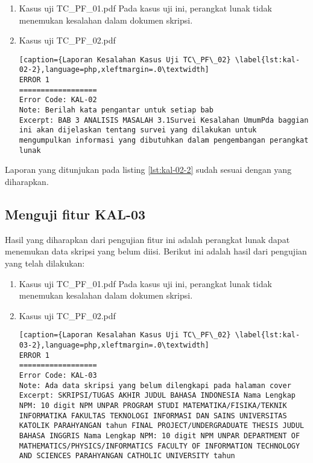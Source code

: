 \begin{enumerate}
	\item Kasus uji TC\_PF\_01.pdf
	Pada kasus uji ini, perangkat lunak tidak menemukan kesalahan dalam dokumen skripsi.
	
	\item Kasus uji TC\_PF\_02.pdf
	
\begin{lstlisting}[caption={Laporan Kesalahan Kasus Uji TC\_PF\_02}	\label{lst:kal-02-2},language=php,xleftmargin=.0\textwidth]
ERROR 1
==================
Error Code: KAL-02
Note: Berilah kata pengantar untuk setiap bab
Excerpt: BAB 3 ANALISIS MASALAH 3.1Survei Kesalahan UmumPda baggian ini akan dijelaskan tentang survei yang dilakukan untuk mengumpulkan informasi yang dibutuhkan dalam pengembangan perangkat lunak
\end{lstlisting}
\end{enumerate}

Laporan yang ditunjukan pada listing \ref{lst:kal-02-2} sudah sesuai dengan yang diharapkan.

\subsection{Menguji fitur KAL-03}
Hasil yang diharapkan dari pengujian fitur ini adalah perangkat lunak dapat menemukan data skripsi yang belum diisi. Berikut ini adalah hasil dari pengujian yang telah dilakukan:

\begin{enumerate}
	\item Kasus uji TC\_PF\_01.pdf
	Pada kasus uji ini, perangkat lunak tidak menemukan kesalahan dalam dokumen skripsi.
	
	\item Kasus uji TC\_PF\_02.pdf
	
\begin{lstlisting}[caption={Laporan Kesalahan Kasus Uji TC\_PF\_02}	\label{lst:kal-03-2},language=php,xleftmargin=.0\textwidth]
ERROR 1
==================
Error Code: KAL-03
Note: Ada data skripsi yang belum dilengkapi pada halaman cover
Excerpt: SKRIPSI/TUGAS AKHIR JUDUL BAHASA INDONESIA Nama Lengkap NPM: 10 digit NPM UNPAR PROGRAM STUDI MATEMATIKA/FISIKA/TEKNIK INFORMATIKA FAKULTAS TEKNOLOGI INFORMASI DAN SAINS UNIVERSITAS KATOLIK PARAHYANGAN tahun FINAL PROJECT/UNDERGRADUATE THESIS JUDUL BAHASA INGGRIS Nama Lengkap NPM: 10 digit NPM UNPAR DEPARTMENT OF MATHEMATICS/PHYSICS/INFORMATICS FACULTY OF INFORMATION TECHNOLOGY AND SCIENCES PARAHYANGAN CATHOLIC UNIVERSITY tahun 
\end{lstlisting}
\end{enumerate}

